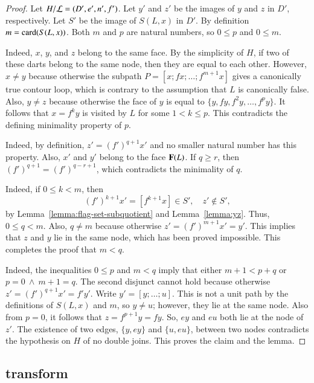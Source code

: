 \begin{proof}
Let $H/{\cal L}=(D',e',n',f')$.  Let $y'$ and $z'$ be the images of $y$ and $z$
in $D'$, respectively.  Let $S'$ be the image of $S(L,x)$ in $D'$.
By definition $m = {\operatorname{card}}(S(L,x))$.  Both $m$ and $p$ are natural numbers,
so $0\le p$ and $0\le m$. 

  Indeed, $x$, $y$, and $z$ belong to
the same face.  By the simplicity of $H$, if two of these darts belong
to the same node, then they are equal to each other.  However, $x\ne
y$ because otherwise the subpath $P=[x;f x;\ldots;f^{m+1}x]$ gives a canonically true contour loop, which is contrary to the assumption that $L$ is
canonically false.  Also, $y\ne z$ because otherwise the face of $y$ is
equal to $\{y,f y,f^2 y,\ldots,f^p y\}$.  It follows that $x = f^k y$
is visited by $L$ for some $1<k\le p$.  This contradicts the defining
minimality property of $p$.

  Indeed,
by definition, $z' = (f')^{q+1} x'$ and no smaller natural
number has this property.  Also, $x'$ and $y'$ belong to the face ${\mathbf F}(L)$.
If $q\ge r$, then $(f')^{q+1} = (f')^{q-r+1}$, which contradicts the minimality of $q$.

 Indeed, if $0\le k< m$, then
\[ 
(f')^{k+1} x' = [f^{k+1} x]\in S', \quad z' \not\in S',
\] 
by Lemma~\ref{lemma:flag-set-subquotient} and Lemma~\ref{lemma:yz}.
Thus, $0\le q< m$.  Also, $q\ne m$ because otherwise $z' = (f')^{m+1} x'
= y'$.  This implies that $z$ and $y$ lie in the same node, which has
been proved impossible.  This completes the proof that $m<q$.
 
  Indeed, the inequalities $0\le p$ and $m<q$ imply
that either $m+1 < p+q$ or $p=0~\land~m+1=q$.  The second disjunct
cannot hold because otherwise $z' = (f')^{q+1} x' = f' y'$.  Write $y' = [y;\ldots;u]$.
This is not a unit path by the definitions of $S(L,x)$ and $m$, so $y\ne u$; however,
they lie at the same node.  Also from $p=0$, it follows that $z= f^{p+1} y = f y$.
So, $e y$ and $e u$ both lie at the node of $z'$.  The existence of
 two edges, $\{y, e y\}$ and
$\{u, e u\}$, between two nodes contradicts the hypothesis
on $H$ of no double joins.  This proves the claim and the lemma.
\end{proof}

\subsection{transform}

